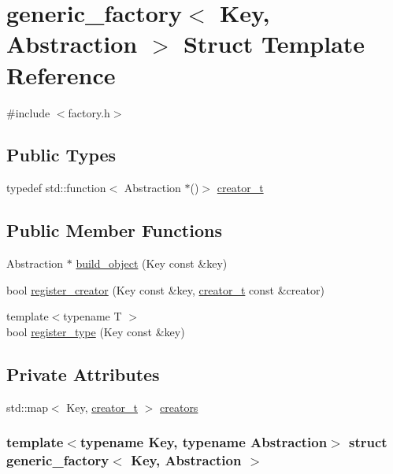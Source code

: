 \hypertarget{structgeneric__factory}{
\section{generic\_\-factory$<$ Key, Abstraction $>$ Struct Template Reference}
\label{structgeneric__factory}
}


{\ttfamily \#include $<$factory.h$>$}\subsection*{Public Types}
\begin{DoxyCompactItemize}
\item 
typedef std::function$<$ Abstraction $\ast$()$>$ \hyperlink{structgeneric__factory_a9df30a5e7a264edbc819878ce107841a}{creator\_\-t}
\end{DoxyCompactItemize}
\subsection*{Public Member Functions}
\begin{DoxyCompactItemize}
\item 
Abstraction $\ast$ \hyperlink{structgeneric__factory_ac58528ffbeed39f52ed7e97f2f4d946c}{build\_\-object} (Key const \&key)
\item 
bool \hyperlink{structgeneric__factory_af6200cfbbc83b6ad06b97f026e66ede6}{register\_\-creator} (Key const \&key, \hyperlink{structgeneric__factory_a9df30a5e7a264edbc819878ce107841a}{creator\_\-t} const \&creator)
\item 
{\footnotesize template$<$typename T $>$ }\\bool \hyperlink{structgeneric__factory_a8b200556fb68870167f60b82221c3be2}{register\_\-type} (Key const \&key)
\end{DoxyCompactItemize}
\subsection*{Private Attributes}
\begin{DoxyCompactItemize}
\item 
std::map$<$ Key, \hyperlink{structgeneric__factory_a9df30a5e7a264edbc819878ce107841a}{creator\_\-t} $>$ \hyperlink{structgeneric__factory_a80aac7cee498bc332fc08e9ef807a8a1}{creators}
\end{DoxyCompactItemize}
\subsubsection*{template$<$typename Key, typename Abstraction$>$ struct generic\_\-factory$<$ Key, Abstraction $>$}



